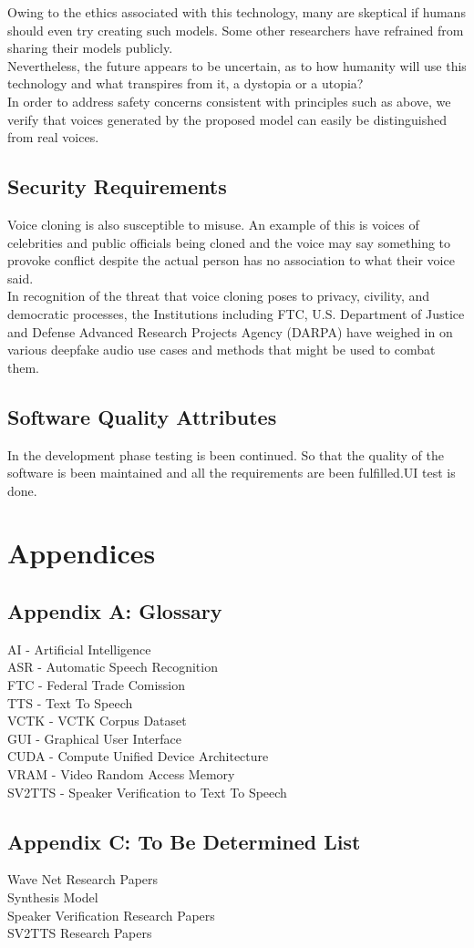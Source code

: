\documentclass[12pt]{report}
\begin{document}
Owing to the ethics associated with this technology, many are skeptical if humans should even try creating such models. Some other researchers have refrained from sharing their models publicly.\\

Nevertheless, the future appears to be uncertain, as to how humanity will use this technology and what transpires from it, a dystopia or a utopia?\\

In order to address safety concerns consistent with principles such as above,
we verify that voices generated by the proposed model can easily be distinguished from real voices.

\section{Security Requirements}
Voice cloning is also susceptible to misuse. An example of this is voices of celebrities and public officials being cloned and the voice may say something to provoke conflict despite the actual person has no association to what their voice said.\\

In recognition of the threat that voice cloning poses to privacy, civility, and democratic processes, the Institutions including FTC, U.S. Department of Justice and Defense Advanced Research Projects Agency (DARPA) have weighed in on various deepfake audio use cases and methods that might be used to combat them.\\

\section{Software Quality Attributes}
In the development phase testing is been continued. So
that the quality of the software is been maintained and all the requirements are been
fulfilled.UI test is done.

\chapter{Appendices}
\section{Appendix A: Glossary}
\noindent AI - Artificial Intelligence\\
\noindent ASR -  Automatic Speech Recognition\\
\noindent FTC -  Federal Trade Comission\\
\noindent TTS - Text To Speech\\
\noindent VCTK - VCTK Corpus Dataset\\
\noindent  GUI - Graphical User Interface\\
\noindent CUDA - Compute Unified Device Architecture\\
\noindent VRAM - Video Random Access Memory\\
\noindent SV2TTS - Speaker Verification to Text To Speech


\section{Appendix C: To Be Determined List}
Wave Net Research Papers\\
Synthesis Model\\
Speaker Verification Research Papers\\
SV2TTS Research Papers
\end{document}
